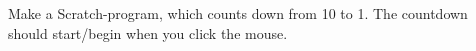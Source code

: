 Make a Scratch-program, which counts down from 10 to 1. The countdown should start/begin when you click the mouse.
